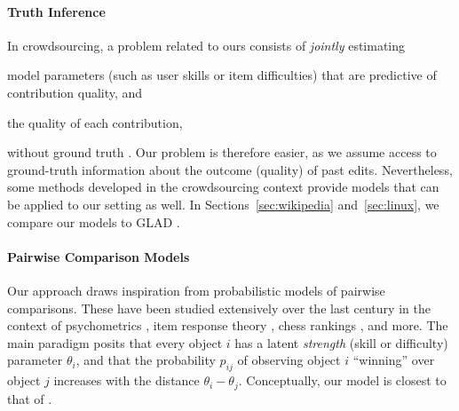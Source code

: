 \documentclass[format=sigconf]{acmart}
\begin{document}
\paragraph{Truth Inference}
In crowdsourcing, a problem related to ours consists of \emph{jointly} estimating
\begin{enuminline}
\item model parameters (such as user skills or item difficulties) that are predictive of contribution quality, and
\item the quality of each contribution,
\end{enuminline}
without ground truth \citep{dawid1979maximum}.
Our problem is therefore easier, as we assume access to ground-truth information about the outcome (quality) of past edits.
Nevertheless, some methods developed in the crowdsourcing context \citep{whitehill2009whose, welinder2010multidimensional, zhou2012learning} provide models that can be applied to our setting as well.
In Sections~\ref{sec:wikipedia} and~\ref{sec:linux}, we compare our models to GLAD \citep{whitehill2009whose}.


\paragraph{Pairwise Comparison Models}
Our approach draws inspiration from probabilistic models of pairwise comparisons.
These have been studied extensively over the last century in the context of psychometrics \citep{thurstone1927law, bradley1952rank}, item response theory \citep{rasch1960probabilistic}, chess rankings \citep{zermelo1928berechnung, elo1978rating}, and more.
The main paradigm posits that every object $i$ has a latent \emph{strength} (skill or difficulty) parameter $\theta_i$, and that the probability $p_{ij}$ of observing object $i$ ``winning'' over object $j$ increases with the distance $\theta_i - \theta_j$.
Conceptually, our model is closest to that of \citet{rasch1960probabilistic}.
\end{document}
